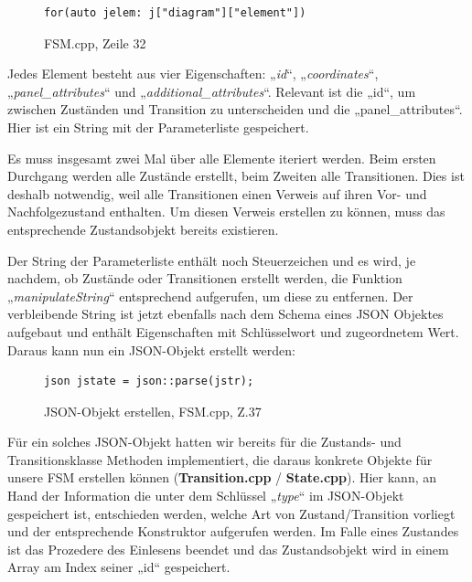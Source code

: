 \begin{figure}[thp]
\begin{lstlisting}[style=json]
for(auto jelem: j["diagram"]["element"])

\end{lstlisting}
\centering
\caption{FSM.cpp, Zeile 32}
\end{figure}

Jedes Element besteht aus vier Eigenschaften: „\textit{id}“, „\textit{coordinates}“,
„\textit{panel\_attributes}“ und „\textit{additional\_attributes}“. Relevant ist die „id“, um
zwischen Zuständen und Transition zu unterscheiden und die „panel\_attributes“.
Hier ist ein String mit der Parameterliste gespeichert.

Es muss insgesamt zwei Mal über alle Elemente iteriert werden. Beim ersten
Durchgang werden alle Zustände erstellt, beim Zweiten alle Transitionen. Dies
ist deshalb notwendig, weil alle Transitionen einen Verweis auf ihren Vor- und
Nachfolgezustand enthalten. Um diesen Verweis erstellen zu können, muss das
entsprechende Zustandsobjekt bereits existieren.

Der String der Parameterliste enthält noch Steuerzeichen und es wird, je
nachdem, ob Zustände oder Transitionen erstellt werden, die Funktion
„\textit{manipulateString}“ entsprechend aufgerufen, um diese zu entfernen. Der
verbleibende String ist jetzt ebenfalls nach dem Schema eines JSON Objektes
aufgebaut und enthält Eigenschaften mit Schlüsselwort und zugeordnetem Wert.
Daraus kann nun ein JSON-Objekt erstellt werden:

\begin{figure}[thp]
\begin{lstlisting}[style=json]
json jstate = json::parse(jstr);

\end{lstlisting}

\centering
\caption{JSON-Objekt erstellen, FSM.cpp, Z.37}
\end{figure}


Für ein solches JSON-Objekt hatten wir bereits für die Zustands- und
Transitionsklasse Methoden implementiert, die daraus konkrete Objekte für unsere
FSM erstellen können (\textbf{Transition.cpp} / \textbf{State.cpp}).
Hier kann, an Hand der Information die unter dem Schlüssel „\textit{type}“ im JSON-Objekt
gespeichert ist, entschieden werden, welche Art von Zustand/Transition vorliegt
und der entsprechende Konstruktor aufgerufen werden.
Im Falle eines Zustandes ist das Prozedere des Einlesens beendet und das
Zustandsobjekt wird in einem Array am Index seiner „id“ gespeichert.

